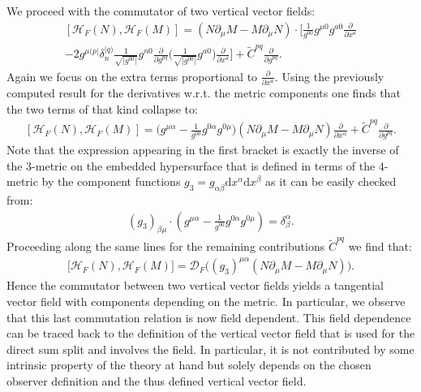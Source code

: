 We proceed with the commutator of two vertical vector fields:
\begin{multline}
    \left[ \mathcal{H}_F(N), \mathcal{H}_F(M) \right] = \left( N\partial_{\mu} M - M \partial_{\mu}N  \right) \cdot \biggl[ \frac{1}{g^{00}} g^{\mu 0} g^{a0} \frac{\partial}{\partial x^a}  \\
    -2 g^{\mu (p\vert} \delta^{\vert q)}_{n} \frac{1}{\sqrt{\vert g^{00} \vert }} g^{n0}  \frac{\partial}{\partial g ^{pq}} \biggl( \frac{1}{\sqrt{\vert g^{00} \vert }} g^{a0} \biggr) \frac{\partial}{\partial x^a} \biggr] + \tilde{C}^{pq} \frac{\partial}{\partial g^{pq}}.
\end{multline}
Again we focus on the extra terms proportional to $\frac{\partial}{\partial x^a}$. Using the previously computed result for the derivatives w.r.t. the metric components one finds that the two terms of that kind collapse to:
\begin{align}
    \left[ \mathcal{H}_F(N), \mathcal{H}_F(M) \right] = \bigl( g^{\mu \alpha} - \frac{1}{g^{00}} g^{0\alpha} g^{0 \mu} \bigr) \left( N\partial_{\mu} M - M \partial_{\mu}N  \right) \frac{\partial}{\partial x^{\alpha}} + \tilde{C}^{pq} \frac{\partial}{\partial g^{pq}}.
\end{align}
Note that the expression appearing in the first bracket is exactly the inverse of the 3-metric on the embedded hypersurface that is defined in terms of the 4-metric by the component functions $g_3 = g_{\alpha \beta} \mathrm{d}x^{\alpha} \mathrm{d}x^{\beta}$ as it can be easily checked from:
\begin{align}
(g_3)_{\beta \mu } \cdot ( g^{\mu \alpha} - \frac{1}{g^{00}} g^{0\alpha} g^{0 \mu} ) = \delta_{\beta}^{\alpha}.
\end{align}
Proceeding along the same lines for the remaining contributions $\tilde{C}^{pq}$ we find that:
\begin{align}\label{FHH}
    \bigl[ \mathcal{H}_F(N), \mathcal{H}_F(M) \bigr] =  \mathcal{D}_F\bigl( (g_3)^{\mu \alpha}( N\partial_{\mu} M - M \partial_{\mu}N  ) \bigr).
\end{align}
Hence the commutator between two vertical vector fields yields a tangential vector field with components depending on the metric.
In particular, we observe that this last commutation relation is now field dependent. This field dependence can be traced back to the definition of the vertical vector field that is used for the direct sum split and involves the field. 
In particular, it is not contributed by some intrinsic property of the theory at hand but solely depends on the chosen observer definition and the thus defined vertical vector field.

